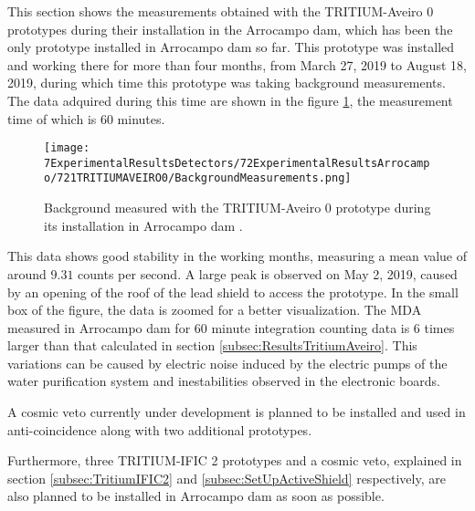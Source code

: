 This section shows the measurements obtained with the TRITIUM-Aveiro 0 prototypes during their installation in the Arrocampo dam, which has been the only prototype installed in Arrocampo dam so far. This prototype was installed and working there for more than four months, from March 27, 2019 to August 18, 2019, during which time this prototype was taking background measurements. The data adquired during this time are shown in the figure \ref{fig:BackgroundArrocampoAveiro}, the measurement time of which is 60 minutes.

\begin{figure}[h]
\centering
\texttt{[image: 7ExperimentalResultsDetectors/72ExperimentalResultsArrocampo/721TRITIUMAVEIRO0/BackgroundMeasurements.png]}
\caption{Background measured with the TRITIUM-Aveiro 0 prototype during its installation in Arrocampo dam \cite{ExperimentalPaperCarlos}.\label{fig:BackgroundArrocampoAveiro}}
\end{figure}

This data shows good stability in the working months, measuring a mean value of around $9.31$ counts per second. A large peak is observed on May 2, 2019, caused by an opening of the roof of the lead shield to access the prototype. In the small box of the figure, the data is zoomed for a better visualization. The MDA measured in Arrocampo dam for 60 minute integration counting data is 6 times larger than that calculated in section \ref{subsec:ResultsTritiumAveiro}. This variations can be caused by electric noise induced by the electric pumps of the water purification system and inestabilities observed in the electronic boards.

A cosmic veto currently under development is planned to be installed and used in anti-coincidence along with two additional prototypes.

Furthermore, three TRITIUM-IFIC 2 prototypes and a cosmic veto, explained in section \ref{subsec:TritiumIFIC2} and \ref{subsec:SetUpActiveShield} respectively, are also planned to be installed in Arrocampo dam as soon as possible.